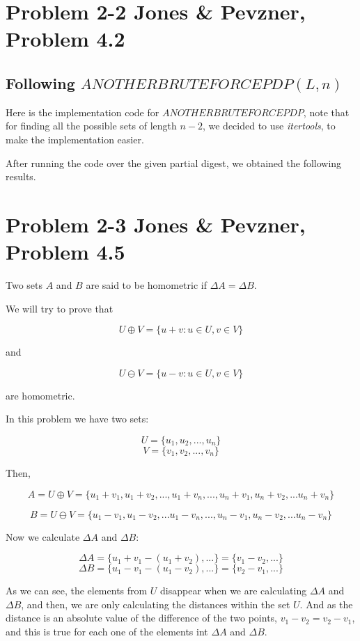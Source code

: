 \documentclass{article}
\begin{document}
\section*{Problem 2-2 Jones \& Pevzner, Problem 4.2}

\subsection*{Following $ANOTHERBRUTEFORCEPDP(L,n)$}

Here is the implementation code for $ANOTHERBRUTEFORCEPDP$, note that for finding all the possible sets of length $n-2$, we decided to use \textit{itertools}, to make the implementation easier.



After running the code over the given partial digest, we obtained the following results.



\section*{Problem 2-3 Jones \& Pevzner, Problem 4.5}

Two sets $A$ and $B$ are said to be homometric if $\Delta A = \Delta B$.

We will try to prove that

$$U\oplus V = \{ u+v:u\in U,v\in V \}$$

and

$$U\ominus V = \{ u-v:u\in U,v\in V \}$$

are homometric.

In this problem we have two sets:

$$U = \{u_1,u_2,...,u_n\}$$
$$V = \{v_1,v_2,...,v_n\}$$

Then,

$$A = U\oplus V = \{ u_1+v_1,u_1+v_2,...,u_1+v_n,...,u_n+v_1,u_n+v_2,...u_n+v_n\}$$

$$B = U\ominus V = \{ u_1-v_1,u_1-v_2,...u_1-v_n,...,u_n-v_1,u_n-v_2,...u_n-v_n\}$$

Now we calculate $\Delta A$ and $\Delta B$:

$$\Delta A = \{ u_1+v_1 - (u_1+v_2),...\} = \{v_1-v_2,...\}$$
$$\Delta B = \{ u_1-v_1 - (u_1-v_2),...\} = \{v_2-v_1,...\}$$

As we can see, the elements from $U$ disappear when we are calculating $\Delta A$ and $\Delta B$, and then, we are only calculating the distances within the set $U$. And as the distance is an absolute value of the difference of the two points, $v_1-v_2 = v_2 - v_1$, and this is true for each one of the elements int $\Delta A$ and $\Delta B$. 
\end{document}
